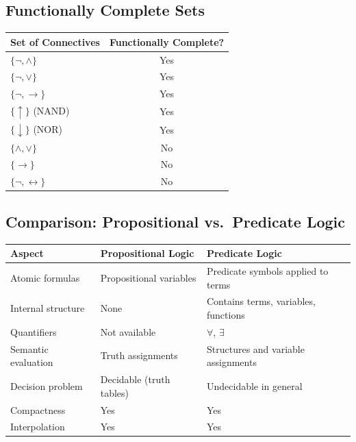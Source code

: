 \subsection{Functionally Complete Sets}

\begin{center}
\renewcommand{\arraystretch}{1.3}
\begin{tabular}{|l|c|}
\hline
\textbf{Set of Connectives} & \textbf{Functionally Complete?} \\
\hline
$\{\neg, \wedge\}$ & Yes \\
$\{\neg, \vee\}$ & Yes \\
$\{\neg, \rightarrow\}$ & Yes \\
$\{\uparrow\}$ (NAND) & Yes \\
$\{\downarrow\}$ (NOR) & Yes \\
$\{\wedge, \vee\}$ & No \\
$\{\rightarrow\}$ & No \\
$\{\neg, \leftrightarrow\}$ & No \\
\hline
\end{tabular}
\end{center}

\subsection{Comparison: Propositional vs.\ Predicate Logic}

\begin{center}
\renewcommand{\arraystretch}{1.3}
\begin{tabular}{|p{4cm}|p{5cm}|p{5cm}|}
\hline
\textbf{Aspect} & \textbf{Propositional Logic} & \textbf{Predicate Logic} \\
\hline
Atomic formulas & Propositional variables & Predicate symbols applied to terms \\
\hline
Internal structure & None & Contains terms, variables, functions \\
\hline
Quantifiers & Not available & $\forall$, $\exists$ \\
\hline
Semantic evaluation & Truth assignments & Structures and variable assignments \\
\hline
Decision problem & Decidable (truth tables) & Undecidable in general \\
\hline
Compactness & Yes & Yes \\
\hline
Interpolation & Yes & Yes \\
\hline
\end{tabular}
\end{center}

